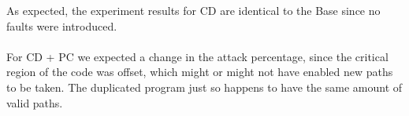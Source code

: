As expected, the experiment results for CD are identical to the Base since no faults were introduced.\\\\
For CD + PC we expected a change in the attack percentage, since the critical region of the code was offset, which might or might not have enabled new paths to be taken. The duplicated program just so happens to have the same amount of valid paths.